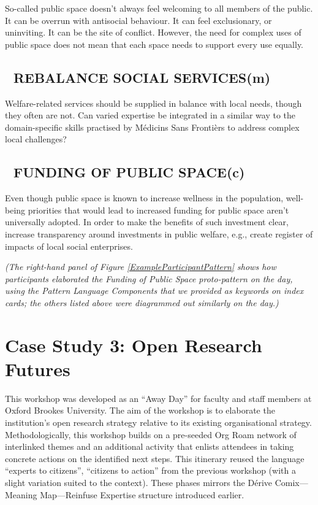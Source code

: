 \documentclass[acmlarge,timestamp]{acmart}
\newcommand{\cognitive}{(c)}
\newcommand{\motor}{(m)}
\begin{document}
So-called public space doesn’t always feel welcoming to all members of the public.  It can be overrun with antisocial behaviour.  It can feel exclusionary, or uninviting.  It can be the site of conflict. However, the need for complex uses of public space does not mean that each space needs to support every use equally.

\subsection*{💎 REBALANCE SOCIAL SERVICES{\hfill \motor}}\label{pat:rebalance-social-services}

Welfare-related services should be supplied in balance with local needs, though they often are not. Can varied expertise be integrated in a similar way to the domain-specific skills practised by Médicins Sans Frontièrs to address complex local challenges?

\subsection*{💎 FUNDING OF PUBLIC SPACE{\hfill \cognitive}}\label{pat:funding-of-public-space}

Even though public space is known to increase wellness in the population, well-being priorities that would lead to increased funding for public space aren’t universally adopted.  In order to make the benefits of such investment clear, increase transparency around investments in public welfare, e.g., create register of impacts of local social enterprises.

\medskip

\noindent \emph{(The right-hand panel of Figure
\ref{ExampleParticipantPattern} shows how participants elaborated the
    {\sc Funding of Public Space} proto-pattern on the day, using the
    {\sc Pattern Language Components} that we provided as keywords on
    index cards; the others listed above were diagrammed out similarly
    on the day.)}

\medskip

\clearpage
\section{Case Study 3: Open Research Futures}

This workshop was developed as an “Away Day” for faculty and staff
members at Oxford Brookes University.  The aim of the workshop is to
elaborate the institution’s open research strategy relative to its
existing organisational strategy.  Methodologically, this workshop
builds on a pre-seeded Org Roam network of interlinked themes and an
additional activity that enlists attendees in taking concrete actions
on the identified next steps.  This itinerary reused the language
“experts to citizens”, “citizens to action” from the previous workshop
(with a slight variation suited to the context).  These phases mirrors
the {\sc Dérive Comix}—{\sc Meaning Map}—{\sc Reinfuse Expertise}
structure introduced earlier.
\end{document}
